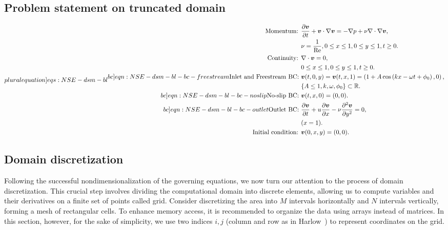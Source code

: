 \documentclass{article}
\begin{document}
\subsection{Problem statement on truncated domain}
\begin{subequations}
\label[pluralequation]{eqs:NSE-dsm-bl}
\begin{align}
\label{eqn:momentum}
\text{Momentum: }	&\frac{\partial \boldsymbol{v}}{\partial t} + \boldsymbol{v} \cdot \nabla \boldsymbol{v} = -\nabla p + \nu \nabla \cdot \nabla \boldsymbol{v}, \\ 
					&\nu = \frac{1}{\operatorname{Re}},0\leq x \leq 1, 0\leq y \leq 1, t\geq0.\notag\\
\label{eqn:continuity-dsm-bl}
\text{Continuity: }	& \nabla \cdot \boldsymbol{v} = 0, \\ 
					&0\leq x \leq 1, 0\leq y \leq 1, t\geq0. \notag\\
\label[bc]{eqn:NSE-dsm-bl-bc-freestream}
\text{Inlet and Freestream BC: } 	& \boldsymbol{v}(t,0,y)=\boldsymbol{v}(t,x,1)=\left(1 + A\cos\left( kx -\omega t + \phi_0 \right),0\right),\\
									& \{A\leq 1,k,\omega, \phi_0\}\subset \mathbb{R}.\notag\\
\label[bc]{eqn:NSE-dsm-bl-bc-noslip}
\text{No-slip BC: } & \boldsymbol{v}(t,x,0)=(0,0). \\
\label[bc]{eqn:NSE-dsm-bl-bc-outlet}
\text{Outlet BC: } 	&\frac{\partial \boldsymbol{v}}{\partial t}+u\frac{\partial \boldsymbol{v}}{\partial x}-\nu \frac{\partial^2 \boldsymbol{v}}{\partial y^2}=0, \\ 
					& (x=1).\notag\\
\text{Initial condition: } &\boldsymbol{v}(0,x,y)=(0,0).
\end{align}
\end{subequations}

\subsection{Domain discretization}\label{subsec:dsm-domain}
Following the successful nondimensionalization of the governing equations, we now turn our attention to the process of domain discretization. This crucial step involves dividing the computational domain into discrete elements, allowing us to compute variables and their derivatives on a finite set of points called grid. Consider discretizing the area into $M$ intervals horizontally and $N$ intervals vertically, forming a mesh of rectangular cells. To enhance memory access, it is recommended to organize the data using arrays instead of matrices. In this section, however, for the sake of simplicity, we use two indices $i,j$ (column and row as in Harlow~\cite{Harlow:1965}) to represent coordinates on the grid.
\end{document}
